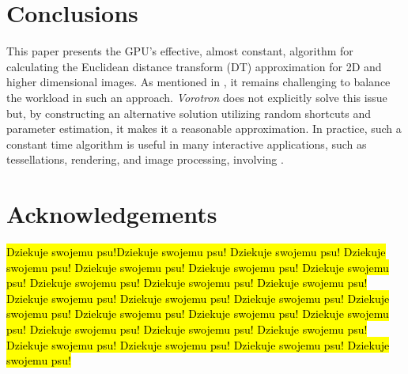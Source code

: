 \documentclass[format=acmsmall,screen,review,authordraft,nonacm]{acmart}
\newcommand{\ourjfa}{Vorotron} %
\begin{document}
\section{Conclusions} %

This paper presents the GPU's effective, almost constant, algorithm for calculating the Euclidean distance transform (DT) approximation for 2D and higher dimensional images.
%
As mentioned in \cite{cao2010parallel}, it remains challenging to balance the workload in such an approach.
%
\textit{\ourjfa} does not explicitly solve this issue but, by constructing an alternative solution utilizing random shortcuts and parameter estimation, it makes it a reasonable approximation.
%
In practice, such a constant time algorithm is useful in many interactive applications, such as tessellations, rendering, and image processing, involving \cite{rong2006jump}.

\section{Acknowledgements} %

\hl{Dziekuje swojemu psu!Dziekuje swojemu psu! Dziekuje swojemu psu! Dziekuje swojemu psu! Dziekuje swojemu psu! Dziekuje swojemu psu! Dziekuje swojemu psu! Dziekuje swojemu psu! Dziekuje swojemu psu! Dziekuje swojemu psu! Dziekuje swojemu psu! Dziekuje swojemu psu! Dziekuje swojemu psu! Dziekuje swojemu psu! Dziekuje swojemu psu! Dziekuje swojemu psu! Dziekuje swojemu psu! Dziekuje swojemu psu! Dziekuje swojemu psu! Dziekuje swojemu psu! Dziekuje swojemu psu! Dziekuje swojemu psu! Dziekuje swojemu psu! Dziekuje swojemu psu!  }




\end{document}
